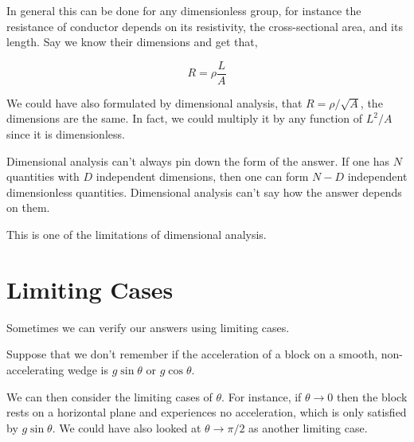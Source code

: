 In general this can be done for any dimensionless group, for instance the 
resistance of conductor depends on its resistivity, the cross-sectional area, 
and its length. Say we know their dimensions and get that, 

\begin{equation*}
    R = \rho \frac{L}{A}
\end{equation*}

We could have also formulated by dimensional analysis, that \(R = \rho/\sqrt{A}\), the 
dimensions are the same. In fact, we could multiply it by any function of 
\(L^2/A\) since it is dimensionless.

\begin{theorem}
    Dimensional analysis can't always pin down the form of the answer. If one has \(N\) 
    quantities with \(D\) independent dimensions, then one can form \(N - D\) 
    independent dimensionless quantities. Dimensional analysis can't say how the answer depends 
    on them.
\end{theorem}

This is one of the limitations of dimensional analysis.

\section{Limiting Cases}

Sometimes we can verify our answers using limiting cases.

Suppose that we don't remember if the acceleration of a block 
on a smooth, non-accelerating wedge is \(g\sin\theta\) or \(g\cos\theta\).

We can then consider the limiting cases of \(\theta\). For instance, 
if \(\theta \to 0\) then the block rests on a horizontal plane and experiences no 
acceleration, which is only satisfied by \(g\sin\theta\). We could have 
also looked at \(\theta \to \pi/2\) as another limiting case.

